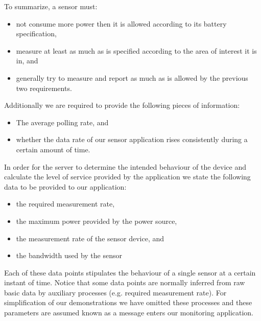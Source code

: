 To summarize, a sensor must:
\begin{itemize}
\nospace
\item not consume more power then it is allowed according to its battery specification,
\item measure at least as much as is specified according to the area of interest it is in, and
\item generally try to measure and report as much as is allowed by the previous two requirements.
\end{itemize}
Additionally we are required to provide the following pieces of information:
\begin{itemize}
\nospace
\item The average polling rate, and
\item whether the data rate of our sensor application rises consistently during a certain amount of time.
\end{itemize}

In order for the server to determine the intended behaviour of the device and calculate the level of service provided by the application we state the following data to be provided to our application:
\begin{itemize}
\nospace
\item the required measurement rate,
\item the maximum power provided by the power source,
\item the measurement rate of the sensor device, and
\item the bandwidth used by the sensor 
\end{itemize}
Each of these data points stipulates the behaviour of a single sensor at a certain instant of time. Notice that some data points are normally inferred from raw basic data by auxiliary processes (e.g. required measurement rate). For simplification of our demonstrations we have omitted these processes and these parameters are assumed known as a message enters our monitoring application.


